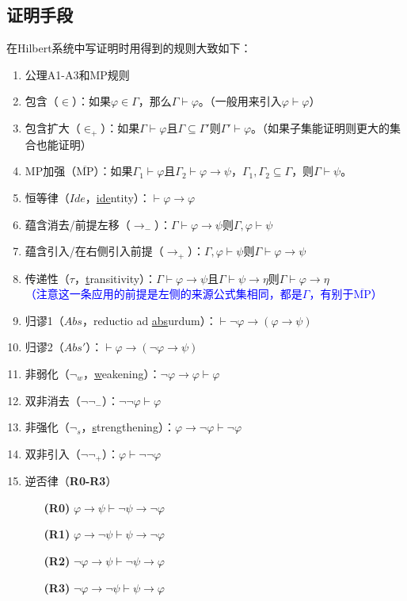 \documentclass[b5paper,oneside]{ctexbook}
\newcommand{\Blue}[1]{\textcolor[named]{blue}{#1}}
\begin{document}
\subsection{证明手段}\label{prooftech}
在Hilbert系统中写证明时用得到的规则大致如下：
\begin{enumerate}
\item 公理A1-A3和MP规则
\item 包含（$\in$）：如果$\varphi\in\Gamma$，那么$\Gamma\vdash\varphi$。（一般用来引入$\varphi\vdash\varphi$）
\item 包含扩大（$\in_+$）：如果$\Gamma\vdash\varphi$且$\Gamma\subseteq\Gamma'$则$\Gamma'\vdash\varphi$。（如果子集能证明则更大的集合也能证明）
\item MP加强（$\overline{\mathrm{MP}}$）：如果$\Gamma_1\vdash\varphi$且$\Gamma_2\vdash\varphi\to\psi$，$\Gamma_1,\Gamma_2\subseteq\Gamma$，则$\Gamma\vdash\psi$。
\item 恒等律（$Ide$，\underline{ide}ntity）：$\vdash\varphi\rightarrow\varphi$
\item 蕴含消去/前提左移（$\rightarrow_-$）：$\Gamma\vdash\varphi\rightarrow\psi$则$\Gamma,\varphi\vdash\psi$
\item 蕴含引入/在右侧引入前提（$\rightarrow_+$）：$\Gamma,\varphi\vdash\psi$则$\Gamma\vdash\varphi\rightarrow\psi$
\item 传递性（$\tau$，\underline{t}ransitivity）：$\Gamma\vdash\varphi\to\psi$且$\Gamma\vdash\psi\to\eta$则$\Gamma\vdash\varphi\to\eta$\\\Blue{（注意这一条应用的前提是左侧的来源公式集相同，都是$\Gamma$，有别于$\overline{\mathrm{MP}}$）}
\item 归谬1（$Abs$，reductio ad \underline{abs}urdum）：$\vdash\neg\varphi\to(\varphi\to\psi)$
\item 归谬2（$Abs'$）：$\vdash\varphi\to(\neg\varphi\to\psi)$
\item 非弱化（$\neg_w$，\underline{w}eakening）：$\neg\varphi\to\varphi\vdash\varphi$
\item 双非消去（$\neg\neg_-$）：$\neg\neg\varphi\vdash\varphi$
\item 非强化（$\neg_s$，\underline{s}trengthening）：$\varphi\to\neg\varphi\vdash\neg\varphi$
\item 双非引入（$\neg\neg_+$）：$\varphi\vdash\neg\neg\varphi$
\item 逆否律（\textbf{R0-R3}）
\begin{enumerate}
\item[\textbf{(R0)}]$\varphi\rightarrow\psi\vdash\neg\psi\rightarrow\neg\varphi$
\item[\textbf{(R1)}]$\varphi\rightarrow\neg\psi\vdash\psi\rightarrow\neg\varphi$
\item[\textbf{(R2)}] $\neg\varphi\rightarrow\psi\vdash\neg\psi\rightarrow\varphi$
\item[\textbf{(R3)}] $\neg\varphi\rightarrow\neg\psi\vdash\psi\rightarrow\varphi$
\end{enumerate}
\end{enumerate}
\end{document}
